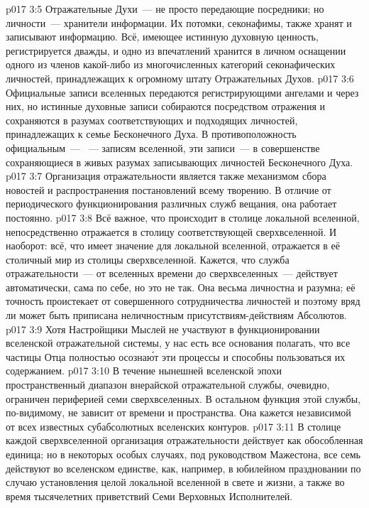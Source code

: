 \vs p017 3:5 \pc Отражательные Духи~--- не просто передающие посредники; но личности~--- хранители информации. Их потомки, секонафимы, также хранят и записывают информацию. Всё, имеющее истинную духовную ценность, регистрируется дважды, и одно из впечатлений хранится в личном оснащении одного из членов какой\hyp{}либо из многочисленных категорий секонафических личностей, принадлежащих к огромному штату Отражательных Духов.
\vs p017 3:6 Официальные записи вселенных передаются регистрирующими ангелами и через них, но истинные духовные записи собираются посредством отражения и сохраняются в разумах соответствующих и подходящих личностей, принадлежащих к семье Бесконечного Духа. В противоположность официальным~--- ~--- записям вселенной, эти записи~---  в совершенстве сохраняющиеся в живых разумах записывающих личностей Бесконечного Духа.
\vs p017 3:7 Организация отражательности является также механизмом сбора новостей и распространения постановлений всему творению. В отличие от периодического функционирования различных служб вещания, она работает постоянно.
\vs p017 3:8 Всё важное, что происходит в столице локальной вселенной, непосредственно отражается в столицу соответствующей сверхвселенной. И наоборот: всё, что имеет значение для локальной вселенной, отражается в её столичный мир из столицы сверхвселенной. Кажется, что служба отражательности~--- от вселенных времени до сверхвселенных~--- действует автоматически, сама по себе, но это не так. Она весьма личностна и разумна; её точность проистекает от совершенного сотрудничества личностей и поэтому вряд ли может быть приписана неличностным присутствиям\hyp{}действиям Абсолютов.
\vs p017 3:9 Хотя Настройщики Мыслей не участвуют в функционировании вселенской отражательной системы, у нас есть все основания полагать, что все частицы Отца полностью осозна\'ют эти процессы и способны пользоваться их содержанием.
\vs p017 3:10 \pc В течение нынешней вселенской эпохи пространственный диапазон внерайской отражательной службы, очевидно, ограничен периферией семи сверхвселенных. В остальном функция этой службы, по\hyp{}видимому, не зависит от времени и пространства. Она кажется независимой от всех известных субабсолютных вселенских контуров.
\vs p017 3:11 В столице каждой сверхвселенной организация отражательности действует как обособленная единица; но в некоторых особых случаях, под руководством Мажестона, все семь действуют во вселенском единстве, как, например, в юбилейном праздновании по случаю установления целой локальной вселенной в свете и жизни, а также во время тысячелетних приветствий Семи Верховных Исполнителей.
